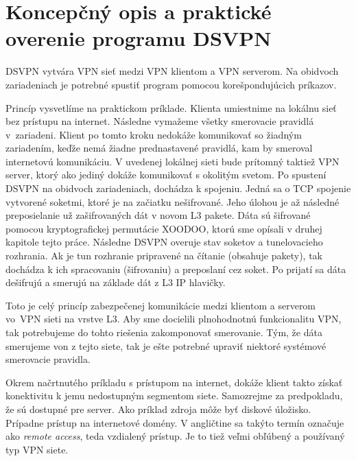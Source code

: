 \section{Koncepčný opis a praktické overenie programu DSVPN}
DSVPN vytvára VPN sieť medzi VPN klientom a VPN serverom. Na obidvoch zariadeniach je potrebné spustiť program pomocou korešpondujúcich príkazov. 

Princíp vysvetlíme na praktickom príklade. Klienta umiestnime na lokálnu sieť bez prístupu na internet. Následne vymažeme všetky smerovacie pravidlá v~zariadeni. Klient po tomto kroku nedokáže komunikovať so žiadným zariadením, keďže nemá žiadne prednastavené pravidlá, kam by smeroval internetovú komunikáciu. V uvedenej lokálnej sieti bude prítomný taktiež VPN server, ktorý ako jediný dokáže komunikovať s okolitým svetom. Po spustení DSVPN na obidvoch zariadeniach, dochádza k spojeniu. Jedná sa o TCP spojenie vytvorené soketmi, ktoré je na začiatku nešifrované. Jeho úlohou je až následné preposielanie už zašifrovaných dát v novom L3 pakete. Dáta sú šifrované pomocou kryptografickej permutácie XOODOO, ktorú sme opísali v druhej kapitole tejto práce. Následne DSVPN overuje stav soketov a tunelovacieho rozhrania. Ak je tun rozhranie pripravené na čítanie (obsahuje pakety), tak dochádza k ich spracovaniu (šifrovaniu) a preposlaní cez soket. Po prijatí sa dáta dešifrujú a smerujú na základe dát z L3 IP hlavičky. 

Toto je celý princíp zabezpečenej komunikácie medzi klientom a serverom vo~VPN sieti na vrstve L3. Aby sme docielili plnohodnotnú funkcionalitu VPN, tak potrebujeme do tohto riešenia zakomponovať smerovanie. Tým, že dáta smerujeme von z tejto siete, tak je ešte potrebné upraviť niektoré systémové smerovacie pravidla.      

Okrem načrtnutého príkladu s prístupom na internet, dokáže klient takto získať konektivitu k jemu nedostupným segmentom siete. Samozrejme za predpokladu, že sú dostupné pre server. Ako príklad zdroja môže byť diskové úložisko. Prípadne prístup na internetové domény. V angličtine sa takýto termín označuje ako \textit{remote access}, teda vzdialený prístup. Je to tiež veľmi obľúbený a používaný typ VPN siete. 

